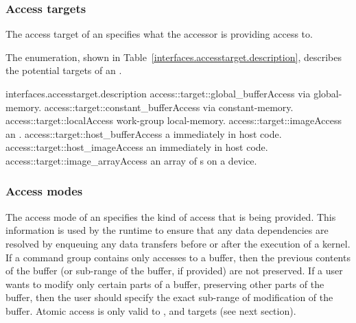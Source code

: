 
\subsubsection{Access targets}
\label{sub.section.access.targets}

The access target of an  specifies what the accessor is
providing access to.

The  enumeration, shown in
Table~\ref{interfaces.accesstarget.description}, describes the potential targets
of an .


{interfaces.accesstarget.description}
\addRow
    {access::target::global_buffer}{Access  via \gls{global-memory}.}
  \addRow
    {access::target::constant_buffer}{Access  via \gls{constant-memory}.}
  \addRow
    {access::target::local}{Access work-group \gls{local-memory}.}
  \addRow
    {access::target::image}{Access an .}
  \addRow
    {access::target::host_buffer}{Access a  immediately in host code.}
  \addRow
    {access::target::host_image}{Access an  immediately in host code.}
  \addRow
    {access::target::image_array}{Access an array of s on a device.}
\completeTable


\subsubsection{Access modes}
\label{sub.section.access.mode}

The access mode of an  specifies the kind of access that is
being provided. This information is used by the runtime to ensure that any
data dependencies are resolved by enqueuing any data transfers before
or after the execution of a kernel. If a command group contains only
 accesses to a buffer, then the previous contents
of the buffer (or sub-range of the buffer, if provided) are not
preserved. If a user wants to modify only certain parts of a buffer,
preserving other parts of the buffer, then the user should specify the
exact sub-range of modification of the buffer.
Atomic access is only valid to , 
and  targets (see next section).

